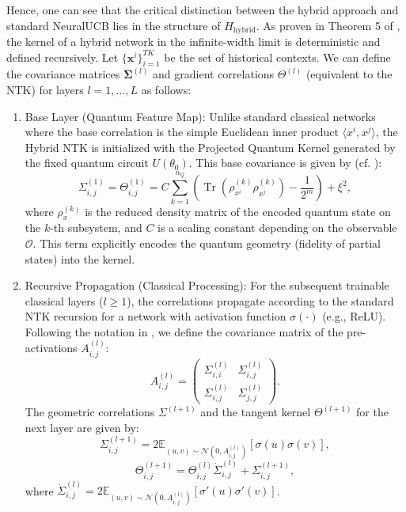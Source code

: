 \documentclass[pdflatex,sn-mathphys-num]{sn-jnl}%
\theoremstyle{thmstyleone}%
\theoremstyle{thmstyletwo}%
\theoremstyle{thmstylethree}%
\newcommand{\xbf}{\mathbf{x}}
\begin{document}
\begin{appendices}
Hence, one can see that the critical distinction between the hybrid approach and standard NeuralUCB lies in the structure of $H_{\text{hybrid}}$. As proven in Theorem 5 of \cite{hybridqcntk}, the kernel of a hybrid network in the infinite-width limit is deterministic and defined recursively. Let $\{\xbf^i\}_{i=1}^{TK}$ be the set of historical contexts. We can define the covariance matrices $\bm{\Sigma}^{(l)}$ and gradient correlations $\Theta^{(l)}$ (equivalent to the NTK) for layers $l=1, \dots, L$ as follows:
\begin{enumerate}
    \item Base Layer (Quantum Feature Map): Unlike standard classical networks where the base correlation is the simple Euclidean inner product $\langle x^i, x^j \rangle$, the Hybrid NTK is initialized with the Projected Quantum Kernel generated by the fixed quantum circuit $U(\theta_0)$. This base covariance is given by (cf. \cite{hybridqcntk}): $$\Sigma_{i,j}^{(1)} = \Theta_{i,j}^{(1)} = C \sum_{k=1}^{n_Q} \left( \operatorname{Tr}(\rho_{x^i}^{(k)} \rho_{x^j}^{(k)}) - \frac{1}{2^m} \right) + \xi^2,$$ 
    where $\rho_{x}^{(k)}$ is the reduced density matrix of the encoded quantum state on the $k$-th subsystem, and $C$ is a scaling constant depending on the observable $\mathcal{O}$. This term explicitly encodes the quantum geometry (fidelity of partial states) into the kernel.
    \item Recursive Propagation (Classical Processing): For the subsequent trainable classical layers ($l \ge 1$), the correlations propagate according to the standard NTK recursion for a network with activation function $\sigma(\cdot)$ (e.g., ReLU). Following the notation in \cite{neuralucb,hybridqcntk}, we define the covariance matrix of the pre-activations $A_{i,j}^{(l)}$:$$A_{i,j}^{(l)} = \begin{pmatrix} \Sigma_{i,i}^{(l)} & \Sigma_{i,j}^{(l)} \\ \Sigma_{i,j}^{(l)} & \Sigma_{j,j}^{(l)} \end{pmatrix}.$$The geometric correlations $\Sigma^{(l+1)}$ and the tangent kernel $\Theta^{(l+1)}$ for the next layer are given by:$$\Sigma_{i,j}^{(l+1)} = 2 \mathbb{E}_{(u,v) \sim \mathcal{N}(0, A_{i,j}^{(l)})} [\sigma(u)\sigma(v)],$$$$\Theta_{i,j}^{(l+1)} = \Theta_{i,j}^{(l)} \dot{\Sigma}_{i,j}^{(l)} + \Sigma_{i,j}^{(l+1)},$$where $\dot{\Sigma}_{i,j}^{(l)} = 2 \mathbb{E}_{(u,v) \sim \mathcal{N}(0, A_{i,j}^{(l)})} [\sigma'(u)\sigma'(v)]$.
\end{enumerate}



\end{appendices}
\end{document}
